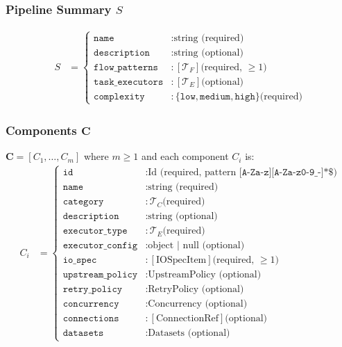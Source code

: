 \documentclass[11pt,a4paper]{article}
\theoremstyle{definition}
\begin{document}
\subsubsection{Pipeline Summary $S$}
\begin{align}
S &=
\begin{cases}
\texttt{name}          &: \text{string (required)} \\
\texttt{description}   &: \text{string (optional)} \\
\texttt{flow\_patterns}&: [\mathcal{T}_F] \text{(required, } \geq 1) \\
\texttt{task\_executors}&: [\mathcal{T}_E] \text{(optional)} \\
\texttt{complexity}    &: \{\texttt{low}, \texttt{medium}, \texttt{high}\} \text{(required)}
\end{cases}
\end{align}

\subsubsection{Components $\mathbf{C}$}
$\mathbf{C} = [C_1, \dots, C_m]$ where $m \geq 1$ and each component $C_i$ is:
\begin{align}
C_i &=
\begin{cases}
\texttt{id}            &: \text{Id (required, pattern } \texttt{\^{}[A-Za-z][A-Za-z0-9\_-]*\$)} \\
\texttt{name}          &: \text{string (required)} \\
\texttt{category}      &: \mathcal{T}_C \text{(required)} \\
\texttt{description}   &: \text{string (optional)} \\
\texttt{executor\_type}&: \mathcal{T}_E \text{(required)} \\
\texttt{executor\_config}&: \text{object | null (optional)} \\
\texttt{io\_spec}      &: [\text{IOSpecItem}] \text{(required, } \geq 1) \\
\texttt{upstream\_policy}&: \text{UpstreamPolicy (optional)} \\
\texttt{retry\_policy}  &: \text{RetryPolicy (optional)} \\
\texttt{concurrency}    &: \text{Concurrency (optional)} \\
\texttt{connections}    &: [\text{ConnectionRef}] \text{(optional)} \\
\texttt{datasets}       &: \text{Datasets (optional)}
\end{cases}
\end{align}
\end{document}
